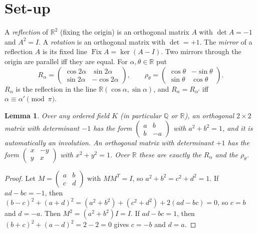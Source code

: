 \documentclass[11pt]{article}
\newtheorem{lemma}[theorem]{Lemma}
\theoremstyle{definition}
\theoremstyle{remark}
\newcommand{\Q}{\mathbb Q}
\newcommand{\R}{\mathbb R}
\newcommand{\Fix}{\operatorname{Fix}}
\begin{document}
\section{Set-up}

A \emph{reflection} of $\R^2$ (fixing the origin) is an orthogonal matrix $A$ with $\det A=-1$
and $A^2=I$. A \emph{rotation} is an orthogonal matrix with $\det=+1$. The \emph{mirror} of a
reflection $A$ is its fixed line $\Fix A=\ker(A-I)$. Two mirrors through the origin are parallel
iff they are equal. For $\alpha,\theta\in\R$ put
\[
R_\alpha=\begin{pmatrix}\cos2\alpha&\sin2\alpha\\ \sin2\alpha&-\cos2\alpha\end{pmatrix},\qquad
\rho_\theta=\begin{pmatrix}\cos\theta&-\sin\theta\\ \sin\theta&\cos\theta\end{pmatrix}.
\]
$R_\alpha$ is the reflection in the line $\R(\cos\alpha,\sin\alpha)$, and $R_\alpha=R_{\alpha'}$
iff $\alpha\equiv\alpha'\pmod\pi$.

\begin{lemma}\label{lem:normal}
Over any ordered field $K$ (in particular $\Q$ or $\R$), an orthogonal $2\times2$ matrix with
determinant $-1$ has the form $\left(\begin{smallmatrix}a&b\\ b&-a\end{smallmatrix}\right)$ with
$a^2+b^2=1$, and it is automatically an involution. An orthogonal matrix with determinant $+1$
has the form $\left(\begin{smallmatrix}x&-y\\ y&x\end{smallmatrix}\right)$ with $x^2+y^2=1$. Over
$\R$ these are exactly the $R_\alpha$ and the $\rho_\theta$.
\end{lemma}
\begin{proof}
Let $M=\left(\begin{smallmatrix}a&b\\ c&d\end{smallmatrix}\right)$ with $MM^{T}=I$, so
$a^2+b^2=c^2+d^2=1$. If $ad-bc=-1$, then
$(b-c)^2+(a+d)^2=(a^2+b^2)+(c^2+d^2)+2(ad-bc)=0$, so $c=b$ and $d=-a$. Then
$M^2=(a^2+b^2)I=I$. If $ad-bc=1$, then $(b+c)^2+(a-d)^2=2-2=0$ gives $c=-b$ and $d=a$.
\end{proof}
\end{document}
